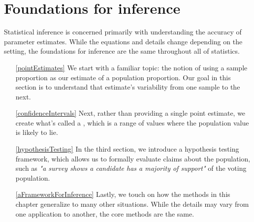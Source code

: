 \chapter{Foundations for inference}
\label{foundationsForInference}
\label{ch_foundations_for_inf}
\renewcommand{\chapterfolder}{ch_foundations_for_inf}

Statistical inference is concerned primarily with understanding the
accuracy of parameter estimates. While the equations and details change
depending on the setting, the foundations for inference are the same
throughout all of statistics.
\begin{enumerate}
\item[\ref{pointEstimates}] We start with a familiar topic:
    the notion of using a sample proportion as our estimate
    of a population proportion. Our goal in this section
    is to understand that estimate's variability from one
    sample to the next.
\item[\ref{confidenceIntervals}] Next, rather than providing
    a single point estimate, we create what's called a
    , which is a range
    of values where the population value is likely to lie.
\item[\ref{hypothesisTesting}] In the third section,
    we introduce a hypothesis testing framework, which allows
    us to formally evaluate claims about the population,
    such as \emph{"a survey shows a candidate has a majority
    of support"} of the voting population.
\item[\ref{aFrameworkForInference}] Lastly, we touch on how
    the methods in this chapter generalize to many other
    situations. While the details may vary from one
    application to another, the core methods are the same.
\end{enumerate}










